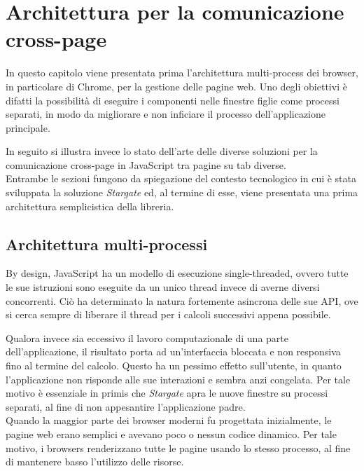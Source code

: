 
\chapter{Architettura per la comunicazione cross-page}
\label{cap:architettura-cross-page}

In questo capitolo viene presentata prima l'architettura multi-process dei browser, in particolare di Chrome, per la gestione delle pagine web. Uno degli obiettivi è difatti la possibilità di eseguire i componenti nelle finestre figlie come processi separati, in modo da migliorare e non inficiare il processo dell'applicazione principale.

In seguito si illustra invece lo stato dell'arte delle diverse soluzioni per la comunicazione cross-page in JavaScript tra pagine su tab diverse. \\

Entrambe le sezioni fungono da spiegazione del contesto tecnologico in cui è stata sviluppata la soluzione \textit{Stargate} ed, al termine di esse, viene presentata una prima architettura semplicistica della libreria.

\section{Architettura multi-processi}

By design, JavaScript ha un modello di esecuzione single-threaded, ovvero tutte le sue istruzioni sono eseguite da un unico \gls{thread} invece di averne diversi concorrenti. Ciò ha determinato la natura fortemente asincrona delle sue API, ove si cerca sempre di liberare il thread per i calcoli successivi appena possibile.

Qualora invece sia eccessivo il lavoro computazionale di una parte dell'applicazione, il risultato porta ad un'interfaccia bloccata e non responsiva fino al termine del calcolo. Questo ha un pessimo effetto sull'utente, in quanto l'applicazione non risponde alle sue interazioni e sembra anzi congelata. Per tale motivo è essenziale in primis che \textit{Stargate} apra le nuove finestre su processi separati, al fine di non appesantire l'applicazione padre. \\

Quando la maggior parte dei browser moderni fu progettata inizialmente, le pagine web erano semplici e avevano poco o nessun codice dinamico. Per tale motivo, i browsers renderizzano tutte le pagine usando lo stesso processo, al fine di mantenere basso l'utilizzo delle risorse. \\

